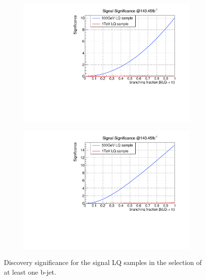\begin{figure}
  \centering
                \begin{subfigure}[t]{0.49\textwidth}
                \includegraphics[width=\textwidth]{figures/plots/Significance/1b-jet_1tau.pdf}
                \label{Significance:1b1tau}
                \end{subfigure}
                \begin{subfigure}[t]{0.49\textwidth}
                \includegraphics[width=\textwidth]{figures/plots/Significance/1b-jet_2tau.pdf}
                \label{Significance:1b2tau}
                \end{subfigure}
\caption[Discovery significance for the signal LQ samples in the selection of at least one b-jet.]{Discovery significance for the signal LQ samples in the selection of at least one b-jet.}
\label{Significance:1b}
\end{figure}
